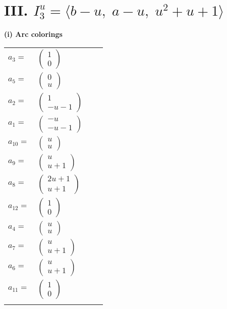 \documentclass[1p]{elsarticle_modified}
\theoremstyle{definition}
\begin{document}
\centering \section*{III. $I^u_{3}= \langle b- u,\;a- u,\;u^2+u+1 \rangle$}
\flushleft \textbf{(i) Arc colorings}\\
\begin{tabular}{m{7pt} m{180pt} m{7pt} m{180pt} }
\flushright $a_{3}=$&$\begin{pmatrix}1\\0\end{pmatrix}$ \\
\flushright $a_{5}=$&$\begin{pmatrix}0\\u\end{pmatrix}$ \\
\flushright $a_{2}=$&$\begin{pmatrix}1\\- u-1\end{pmatrix}$ \\
\flushright $a_{1}=$&$\begin{pmatrix}- u\\- u-1\end{pmatrix}$ \\
\flushright $a_{10}=$&$\begin{pmatrix}u\\u\end{pmatrix}$ \\
\flushright $a_{9}=$&$\begin{pmatrix}u\\u+1\end{pmatrix}$ \\
\flushright $a_{8}=$&$\begin{pmatrix}2 u+1\\u+1\end{pmatrix}$ \\
\flushright $a_{12}=$&$\begin{pmatrix}1\\0\end{pmatrix}$ \\
\flushright $a_{4}=$&$\begin{pmatrix}u\\u\end{pmatrix}$ \\
\flushright $a_{7}=$&$\begin{pmatrix}u\\u+1\end{pmatrix}$ \\
\flushright $a_{6}=$&$\begin{pmatrix}u\\u+1\end{pmatrix}$ \\
\flushright $a_{11}=$&$\begin{pmatrix}1\\0\end{pmatrix}$\\&\end{tabular}
\end{document}
